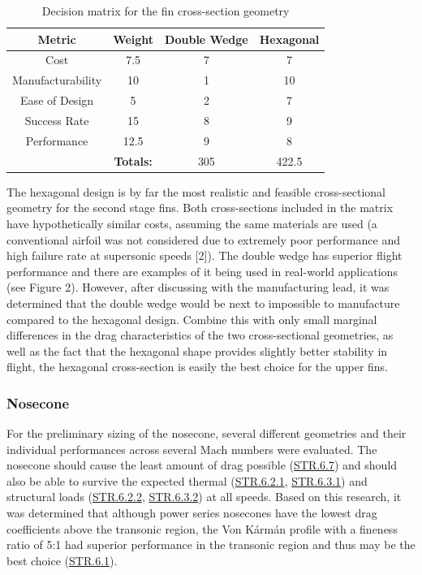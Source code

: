 \begin{table}
    \centering
    \begin{tabular}{cc||cc}
        \textbf{Metric} & \textbf{Weight} & Double Wedge & Hexagonal \\ \hline
        Cost & 7.5 & 7 & 7 \\ 
        Manufacturability & 10 & 1 & 10 \\ 
        Ease of Design & 5 & 2 & 7 \\ 
        Success Rate & 15 & 8 & 9 \\ 
        Performance & 12.5 & 9 & 8 \\ \hline 
         & \textbf{Totals:} & 305 & 422.5
    \end{tabular}
    \caption{Decision matrix for the fin cross-section geometry}
    \label{table:fin-cross-section-design-matrix}
\end{table}

The hexagonal design is by far the most realistic and feasible cross-sectional geometry for the second stage fins. Both cross-sections included in the matrix have hypothetically similar costs, assuming the same materials are used (a conventional airfoil was not considered due to extremely poor performance and high failure rate at supersonic speeds [2]).  The double wedge has superior flight performance and there are examples of it being used in real-world applications (see Figure 2).  However, after discussing with the manufacturing lead, it was determined that the double wedge would be next to impossible to manufacture compared to the hexagonal design. Combine this with only small marginal differences in the drag characteristics of the two cross-sectional geometries, as well as the fact that the hexagonal shape provides slightly better stability in flight, the hexagonal cross-section is easily the best choice for the upper fins.


\subsubsection{Nosecone}

For the preliminary sizing of the nosecone, several different geometries and their individual performances across several Mach numbers were evaluated. The nosecone should cause the least amount of drag possible (\hyperlink{STR.6.7}{STR.6.7}) and should also be able to survive the expected thermal (\hyperlink{STR.6.2.1}{STR.6.2.1}, \hyperlink{STR.6.3.1}{STR.6.3.1}) and structural loads (\hyperlink{STR.6.2.2}{STR.6.2.2}, \hyperlink{STR.6.3.2}{STR.6.3.2}) at all speeds. Based on this research, it was determined that although power series nosecones have the lowest drag coefficients above the transonic region, the Von K\'{a}rm\'{a}n profile with a fineness ratio of 5:1 had superior performance in the transonic region and thus may be the best choice (\hyperlink{STR.6.1}{STR.6.1}).

